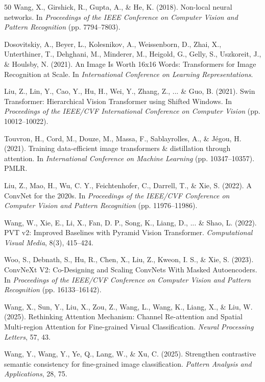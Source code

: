 \documentclass[pdflatex,iicol,sn-mathphys-num]{sn-jnl}
\theoremstyle{thmstyleone}%
\theoremstyle{thmstyletwo}%
\theoremstyle{thmstylethree}%
\begin{document}
{\begin{thebibliography}{50}
     Wang, X., Girshick, R., Gupta, A., \& He, K. (2018). Non-local neural networks. In \textit{Proceedings of the IEEE Conference on Computer Vision and Pattern Recognition} (pp. 7794--7803).
    
    Dosovitskiy, A., Beyer, L., Kolesnikov, A., Weissenborn, D., Zhai, X., Unterthiner, T., Dehghani, M., Minderer, M., Heigold, G., Gelly, S., Uszkoreit, J., \& Houlsby, N. (2021).
    An Image Is Worth 16x16 Words: Transformers for Image Recognition at Scale.
    In \textit{International Conference on Learning Representations}.

     Liu, Z., Lin, Y., Cao, Y., Hu, H., Wei, Y., Zhang, Z., ... \& Guo, B. (2021). Swin Transformer: Hierarchical Vision Transformer using Shifted Windows. In \textit{Proceedings of the IEEE/CVF International Conference on Computer Vision} (pp. 10012--10022).
    
     Touvron, H., Cord, M., Douze, M., Massa, F., Sablayrolles, A., \& Jégou, H. (2021). Training data-efficient image transformers \& distillation through attention. In \textit{International Conference on Machine Learning} (pp. 10347--10357). PMLR.
    
     Liu, Z., Mao, H., Wu, C. Y., Feichtenhofer, C., Darrell, T., \& Xie, S. (2022). A ConvNet for the 2020s. In \textit{Proceedings of the IEEE/CVF Conference on Computer Vision and Pattern Recognition} (pp. 11976--11986).
    
     Wang, W., Xie, E., Li, X., Fan, D. P., Song, K., Liang, D., ... \& Shao, L. (2022). PVT v2: Improved Baselines with Pyramid Vision Transformer. \textit{Computational Visual Media}, 8(3), 415--424.
    
     Woo, S., Debnath, S., Hu, R., Chen, X., Liu, Z., Kweon, I. S., \& Xie, S. (2023). ConvNeXt V2: Co-Designing and Scaling ConvNets With Masked Autoencoders. In \textit{Proceedings of the IEEE/CVF Conference on Computer Vision and Pattern Recognition} (pp. 16133--16142).
    
     Wang, X., Sun, Y., Liu, X., Zou, Z., Wang, L., Wang, K., Liang, X., \& Liu, W. (2025). Rethinking Attention Mechanism: Channel Re-attention and Spatial Multi-region Attention for Fine-grained Visual Classification. \textit{Neural Processing Letters}, 57, 43.
    
     Wang, Y., Wang, Y., Ye, Q., Lang, W., \& Xu, C. (2025). Strengthen contrastive semantic consistency for fine-grained image classification. \textit{Pattern Analysis and Applications}, 28, 75.
    

\end{thebibliography}}
\end{document}
